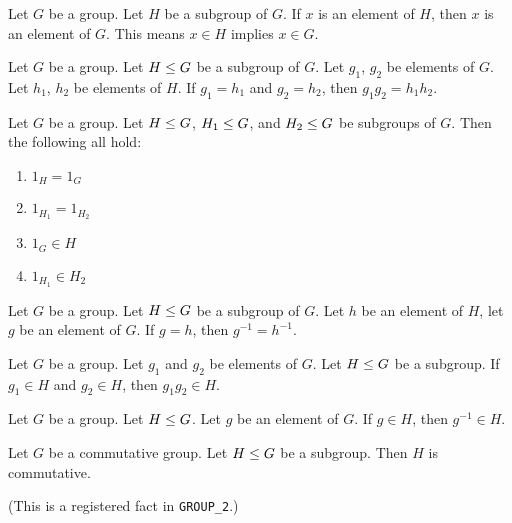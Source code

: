 \begin{theorem}
Let $G$ be a group. Let $H$ be a subgroup of $G$.
If $x$ is an element of $H$, then $x$ is an element of $G$.
This means $x\in H$ implies $x\in G$.
\end{theorem}

\begin{theorem}
Let $G$ be a group. Let $H\leq G$ be a subgroup of $G$.
Let $g_{1}$, $g_{2}$ be elements of $G$.
Let $h_{1}$, $h_{2}$ be elements of $H$.
If $g_{1}=h_{1}$ and $g_{2}=h_{2}$, then $g_{1}g_{2}=h_{1}h_{2}$.
\end{theorem}

\begin{theorem}
Let $G$ be a group.
Let $H\leq G$, $H_{1}\leq G$, and $H_{2}\leq G$ be subgroups of $G$.
Then the following all hold:
\begin{enumerate}
\item $1_{H}=1_{G}$
\item $1_{H_{1}}=1_{H_{2}}$
\item $1_{G}\in H$
\item $1_{H_{1}}\in H_{2}$
\end{enumerate}
\end{theorem}

\begin{theorem}
Let $G$ be a group.
Let $H\leq G$ be a subgroup of $G$.
Let $h$ be an element of $H$, let $g$ be an element of $G$.
If $g=h$, then $g^{-1}=h^{-1}$.
\end{theorem}

\begin{theorem}
Let $G$ be a group. Let $g_{1}$ and $g_{2}$ be elements of $G$.
Let $H\leq G$ be a subgroup.
If $g_{1}\in H$ and $g_{2}\in H$, then $g_{1}g_{2}\in H$.
\end{theorem}

\begin{theorem}
Let $G$ be a group. Let $H\leq G$. Let $g$ be an element of $G$.
If $g\in H$, then $g^{-1}\in H$.
\end{theorem}

\begin{theorem}
Let $G$ be a commutative group. Let $H\leq G$ be a subgroup.
Then $H$ is commutative.
\end{theorem}
(This is a registered fact in \texttt{GROUP\_2}.)

